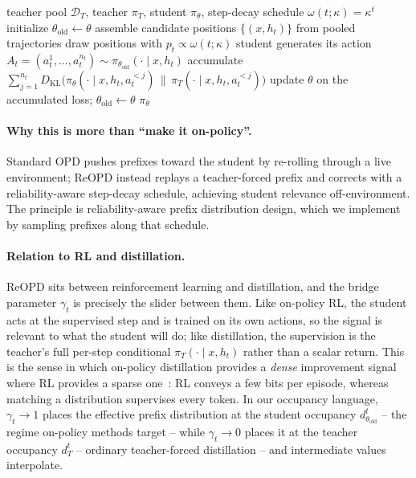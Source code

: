 \begin{algorithm}[t]
\caption{Replayed-Prefix On-Policy Distillation (ReOPD)}
\label{alg:aopd}
\begin{algorithmic}[1]
\Require teacher pool \(\mathcal D_T\), teacher \(\pi_T\), student \(\pi_\theta\),
step-decay schedule \(\omega(t;\kappa)=\kappa^{t}\)
\State initialize \(\theta_{\mathrm{old}}\leftarrow\theta\)
  \State assemble candidate positions \(\{(x,h_t)\}\) from pooled trajectories 
  \State draw positions with \(p_t\propto\omega(t;\kappa)\) 
    \State student generates its action \(A_t=(a_t^1,\dots,a_t^{n_t})\sim\pi_{\theta_{\mathrm{old}}}(\cdot\mid x,h_t)\) 
    \State accumulate \(\sum_{j=1}^{n_t} D_{\mathrm{KL}}\!\big(\pi_\theta(\cdot\mid x,h_t,a_t^{<j})\,\|\,\pi_T(\cdot\mid x,h_t,a_t^{<j})\big)\) 
  \EndFor
  \State update \(\theta\) on the accumulated loss; \(\theta_{\mathrm{old}}\leftarrow\theta\)
\EndFor
\State \Return \(\pi_\theta\)
\end{algorithmic}
\end{algorithm}

\paragraph{Why this is more than ``make it on-policy''.}
Standard OPD pushes prefixes toward the student by re-rolling through a live
environment; ReOPD instead replays a teacher-forced prefix and corrects with a
reliability-aware step-decay schedule, achieving student relevance off-environment. The
principle is reliability-aware prefix distribution design, which we implement by
sampling prefixes along that schedule.

\paragraph{Relation to RL and distillation.}
ReOPD sits between reinforcement learning and distillation, and the bridge parameter
\(\gamma_t\) is precisely the slider between them. Like on-policy RL, the student
acts at the supervised step and is trained on its own actions, so the signal is
relevant to what the student will do; like distillation, the supervision is the
teacher's full per-step conditional \(\pi_T(\cdot\mid x,h_t)\) rather than a scalar
return. This is the sense in which on-policy distillation provides a \emph{dense}
improvement signal where RL provides a sparse one~\citep{thinkingmachines2025onpolicy}:
RL conveys a few bits per episode, whereas matching a distribution supervises every
token. In our occupancy language, \(\gamma_t\!\to\!1\) places the effective prefix
distribution at the student occupancy \(d_{\theta_{\mathrm{old}}}^{t}\) -- the regime
on-policy methods target -- while \(\gamma_t\!\to\!0\) places it at the teacher
occupancy \(d_T^{t}\) -- ordinary teacher-forced distillation -- and intermediate
values interpolate.

